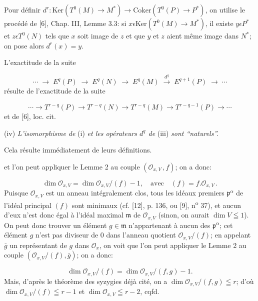Pour définir $d^r\colon \mathrm{Ker}(T^0(M) \to M^*) \to \mathrm{Coker}(T^0(P) \to P^*)$, on utilise le procédé de [6], Chap. III, Lemme 3.3: si $x \epsilon \mathrm{Ker}(T^0(M) \to M^*)$, il existe $y \epsilon P^*$ et $z \epsilon T^0(N)$ tels que $x$ soit image de $z$ et que $y$ et $z$ aient même image dans $N^*$; on pose alors $d^r(x) = y$.

L'exactitude de la suite

\begin{equation*}
\cdots \;\to\; E^q(P) \;\to\; E^q(N) \;\to\; E^q(M) \;\xrightarrow{\ d^q\ }\; E^{q+1}(P) \;\to\; \cdots
\end{equation*}
résulte de l'exactitude de la suite

\begin{equation*}
\cdots \to T^{r-q}(P) \to T^{r-q}(N) \to T^{r-q}(M) \to T^{r-q-1}(P) \to \cdots
\end{equation*}
et de [6], loc. cit.

(iv) \textit{L'isomorphisme de} (i) \textit{et les opérateurs $d^q$ de} (iii) \textit{sont ``naturels''.}

Cela résulte immédiatement de leurs définitions.



 et l'on peut appliquer le Lemme 2 au couple $(\mathcal{O}_{x,V}\,, f)$; on a donc:

\begin{equation*}
\dim \mathcal{O}_{x,V} = \dim \mathcal{O}_{x,V}/(f) - 1, \quad \mathrm{avec} \quad (f) = f.\mathcal{O}_{x,V}\,.
\end{equation*}
Puisque $\mathcal{O}_{x,V}$ est un anneau intégralement clos, tous les idéaux premiers $\mathfrak{p}^{\alpha}$ de l'idéal principal $(f)$ sont minimaux (cf. [12], p. 136, ou [9], n\textsuperscript{o} 37), et aucun d'eux n'est donc égal à l'idéal maximal $\mathfrak{m}$ de $\mathcal{O}_{x,V}$ (sinon, on aurait $\dim V \leqq 1$). On peut donc trouver un élément $g \in \mathfrak{m}$ n'appartenant à aucun des $\mathfrak{p}^{\alpha}$; cet élément $g$ n'est pas diviseur de $0$ dans l'anneau quotient $\mathcal{O}_{x,V}/(f)$; en appelant $\bar{g}$ un représentant de $g$ dans $\mathcal{O}_x$, on voit que l'on peut appliquer le Lemme 2 au couple $(\mathcal{O}_{x,V}/(f), \bar{g})$; on a donc:

\begin{equation*}
\dim \mathcal{O}_{x,V}/(f) = \dim \mathcal{O}_{x,V}/(f, g) - 1.
\end{equation*}
Mais, d'après le théorème des syzygies déjà cité, on a $\dim \mathcal{O}_{x,V}/(f, g) \leqq r$; d'où $\dim \mathcal{O}_{x,V}/(f) \leqq r - 1$ et $\dim \mathcal{O}_{x,V} \leqq r - 2$, cqfd.

